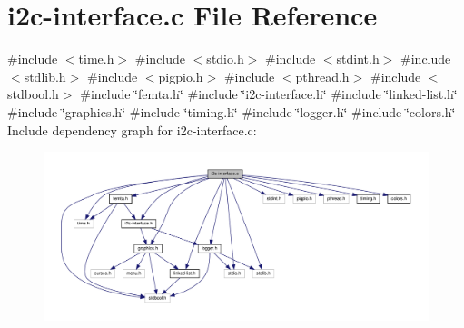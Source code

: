 \hypertarget{i2c-interface_8c}{}\section{i2c-\/interface.c File Reference}
\label{i2c-interface_8c}
{\ttfamily \#include $<$time.\+h$>$}\newline
{\ttfamily \#include $<$stdio.\+h$>$}\newline
{\ttfamily \#include $<$stdint.\+h$>$}\newline
{\ttfamily \#include $<$stdlib.\+h$>$}\newline
{\ttfamily \#include $<$pigpio.\+h$>$}\newline
{\ttfamily \#include $<$pthread.\+h$>$}\newline
{\ttfamily \#include $<$stdbool.\+h$>$}\newline
{\ttfamily \#include \char`\"{}femta.\+h\char`\"{}}\newline
{\ttfamily \#include \char`\"{}i2c-\/interface.\+h\char`\"{}}\newline
{\ttfamily \#include \char`\"{}linked-\/list.\+h\char`\"{}}\newline
{\ttfamily \#include \char`\"{}graphics.\+h\char`\"{}}\newline
{\ttfamily \#include \char`\"{}timing.\+h\char`\"{}}\newline
{\ttfamily \#include \char`\"{}logger.\+h\char`\"{}}\newline
{\ttfamily \#include \char`\"{}colors.\+h\char`\"{}}\newline
Include dependency graph for i2c-\/interface.c\+:
\nopagebreak
\begin{figure}[H]
\begin{center}
\leavevmode
\includegraphics[width=350pt]{i2c-interface_8c__incl}
\end{center}
\end{figure}

